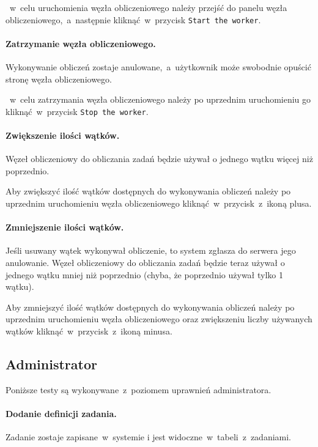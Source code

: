 \documentclass[a4paper,11pt,twoside]{report}
\theoremstyle{definition}
\begin{document}
               ~w~celu uruchomienia węzła obliczeniowego należy przejść do panelu węzła obliczeniowego,~a~następnie kliknąć~w~przycisk \texttt{Start the worker}. 
                
            \paragraph{Zatrzymanie węzła obliczeniowego.}  
                \noindent Wykonywanie obliczeń zostaje anulowane,~a~użytkownik może swobodnie opuścić stronę węzła obliczeniowego.
    
               ~w~celu zatrzymania węzła obliczeniowego należy po uprzednim uruchomieniu go kliknąć~w~przycisk \texttt{Stop the worker}.
                
            \paragraph{Zwiększenie ilości wątków.}   
                \noindent Węzeł obliczeniowy do obliczania zadań będzie używał o jednego wątku więcej niż poprzednio. 

                Aby zwiększyć ilość wątków dostępnych do wykonywania obliczeń należy po uprzednim uruchomieniu węzła obliczeniowego kliknąć~w~przycisk~z~ikoną plusa.

            \paragraph{Zmniejszenie ilości wątków.}   
                \noindent Jeśli usuwany wątek wykonywał obliczenie, to system zgłasza do serwera jego anulowanie. Węzeł obliczeniowy do obliczania zadań będzie teraz używał o jednego wątku mniej niż poprzednio (chyba, że poprzednio używał tylko 1 wątku).

                Aby zmniejszyć ilość wątków dostępnych do wykonywania obliczeń należy po uprzednim uruchomieniu węzła obliczeniowego oraz zwiększeniu liczby używanych wątków kliknąć~w~przycisk~z~ikoną minusa.

        \subsection{Administrator}
            Poniższe testy są wykonywane~z~poziomem uprawnień administratora.

            \paragraph{Dodanie definicji zadania.}   
                \noindent Zadanie zostaje zapisane~w~systemie i jest widoczne~w~tabeli~z~zadaniami. 
\end{document}
